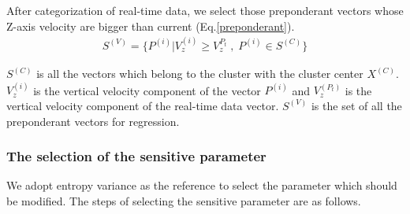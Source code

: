 After categorization of real-time data, we select those preponderant vectors whose Z-axis velocity are bigger than current (Eq.\ref{preponderant}).
\begin{eqnarray}\label{preponderant}
S^{(V)}=\{P^{(i)}|V_{z}^{(i)}\geq V_{z}^{P_{t}} \; , \; P^{(i)}\in S^{(C)}\}
\end{eqnarray}

$S^{(C)}$ is all the vectors which belong to the cluster with the cluster center $X^{(C)}$. $V_{z}^{(i)}$ is the vertical velocity component of the vector $P^{(i)}$ and $V_{z}^{(P_{t})}$ is the vertical velocity component of the real-time data vector. $S^{(V)}$ is the set of all the preponderant vectors for regression.

\subsubsection{The selection of the sensitive parameter}

We adopt entropy variance as the reference to select the parameter which should be modified. The steps of selecting the sensitive parameter are as follows.

